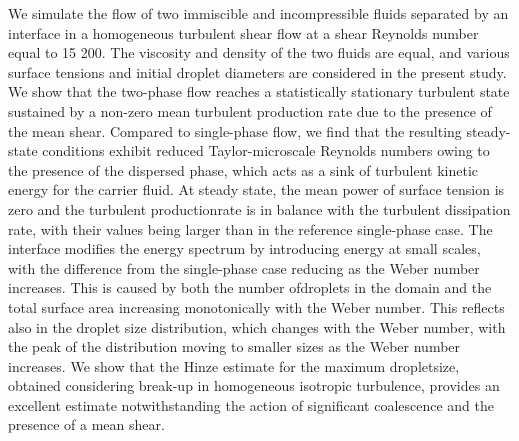 \begin{paper}

\makepapertitle

%
\begin{paperabstract}
We  simulate  the  flow  of  two  immiscible  and  incompressible  fluids  separated  by  an interface  in  a  homogeneous  turbulent  shear  flow  at  a  shear  Reynolds  number  equal to  15 200.  The  viscosity  and  density  of  the  two  fluids  are  equal,  and  various  surface tensions  and  initial  droplet  diameters  are  considered  in  the  present  study.  We  show that  the  two-phase  flow  reaches  a  statistically  stationary  turbulent  state  sustained  by a  non-zero  mean  turbulent  production  rate  due  to  the  presence  of  the  mean  shear. Compared  to  single-phase  flow,  we  find  that  the  resulting  steady-state  conditions exhibit  reduced  Taylor-microscale  Reynolds  numbers  owing  to  the  presence  of  the dispersed  phase,  which  acts  as  a  sink  of  turbulent  kinetic  energy  for  the  carrier  fluid. At steady state, the mean power of surface tension is zero and the turbulent productionrate  is  in  balance  with  the  turbulent  dissipation  rate,  with  their  values  being  larger than  in  the  reference  single-phase  case.  The  interface  modifies  the  energy  spectrum by  introducing  energy  at  small  scales,  with  the  difference  from  the  single-phase  case reducing  as  the  Weber  number  increases.  This  is  caused  by  both  the  number  ofdroplets  in  the  domain  and  the  total  surface  area  increasing  monotonically  with  the Weber  number.  This  reflects  also  in  the  droplet  size  distribution,  which  changes  with the  Weber  number,  with  the  peak  of  the  distribution  moving  to  smaller  sizes  as  the Weber  number  increases.  We  show  that  the  Hinze  estimate  for  the  maximum  dropletsize,  obtained  considering  break-up  in  homogeneous  isotropic  turbulence,  provides an  excellent  estimate  notwithstanding  the  action  of  significant  coalescence  and  the presence  of  a  mean  shear.
\end{paperabstract}


%



%


%

\end{paper}
